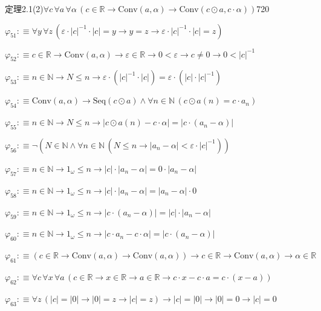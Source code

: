\begin{fullproof}{定理2.1(2)}{$\forall c\,\forall a\,\forall \alpha\,(c \in \mathbb{R} \to \mathrm{Conv}(a,\alpha) \to \mathrm{Conv}(c \odot a,c \cdot \alpha))$}{720}
\begin{abbrevlist}
\item $\varphi_{51} :\equiv \forall y\,\forall z\,(\varepsilon \cdot \lvert c \rvert^{-1} \cdot \lvert c \rvert = y \to y = z \to \varepsilon \cdot \lvert c \rvert^{-1} \cdot \lvert c \rvert = z)$
\item $\varphi_{52} :\equiv c \in \mathbb{R} \to \mathrm{Conv}(a,\alpha) \to \varepsilon \in \mathbb{R} \to 0 < \varepsilon \to c \neq 0 \to 0 < \lvert c \rvert^{-1}$
\item $\varphi_{53} :\equiv n \in \mathbb{N} \to N \leq n \to \varepsilon \cdot (\lvert c \rvert^{-1} \cdot \lvert c \rvert) = \varepsilon \cdot (\lvert c \rvert \cdot \lvert c \rvert^{-1})$
\item $\varphi_{54} :\equiv \mathrm{Conv}(a,\alpha) \to \mathrm{Seq}(c \odot a) \land \forall n \in \mathbb{N}\,(c \odot a(n) = c \cdot a_{n})$
\item $\varphi_{55} :\equiv n \in \mathbb{N} \to N \leq n \to \lvert c \odot a(n) - c \cdot \alpha \rvert = \lvert c \cdot (a_{n} - \alpha) \rvert$
\item $\varphi_{56} :\equiv \neg (N \in \mathbb{N} \land \forall n \in \mathbb{N}\,(N \leq n \to \lvert a_{n} - \alpha \rvert < \varepsilon \cdot \lvert c \rvert^{-1}))$
\item $\varphi_{57} :\equiv n \in \mathbb{N} \to 1_{\omega} \leq n \to \lvert c \rvert \cdot \lvert a_{n} - \alpha \rvert = 0 \cdot \lvert a_{n} - \alpha \rvert$
\item $\varphi_{58} :\equiv n \in \mathbb{N} \to 1_{\omega} \leq n \to \lvert c \rvert \cdot \lvert a_{n} - \alpha \rvert = \lvert a_{n} - \alpha \rvert \cdot 0$
\item $\varphi_{59} :\equiv n \in \mathbb{N} \to 1_{\omega} \leq n \to \lvert c \cdot (a_{n} - \alpha) \rvert = \lvert c \rvert \cdot \lvert a_{n} - \alpha \rvert$
\item $\varphi_{60} :\equiv n \in \mathbb{N} \to 1_{\omega} \leq n \to \lvert c \cdot a_{n} - c \cdot \alpha \rvert = \lvert c \cdot (a_{n} - \alpha) \rvert$
\item $\varphi_{61} :\equiv (c \in \mathbb{R} \to \mathrm{Conv}(a,\alpha) \to \mathrm{Conv}(a,\alpha)) \to c \in \mathbb{R} \to \mathrm{Conv}(a,\alpha) \to \alpha \in \mathbb{R}$
\item $\varphi_{62} :\equiv \forall c\,\forall x\,\forall a\,(c \in \mathbb{R} \to x \in \mathbb{R} \to a \in \mathbb{R} \to c \cdot x - c \cdot a = c \cdot (x - a))$
\item $\varphi_{63} :\equiv \forall z\,(\lvert c \rvert = \lvert 0 \rvert \to \lvert 0 \rvert = z \to \lvert c \rvert = z) \to \lvert c \rvert = \lvert 0 \rvert \to \lvert 0 \rvert = 0 \to \lvert c \rvert = 0$

\end{abbrevlist}
\end{fullproof}
